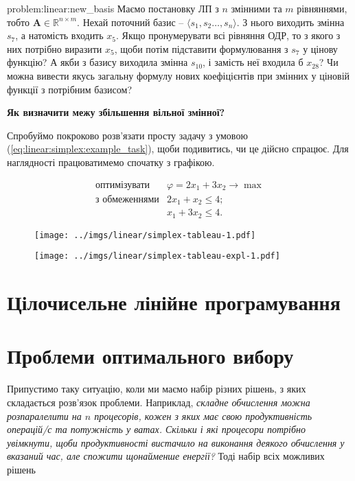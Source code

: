 \documentclass[\main/book.tex]{subfiles}
\begin{document}
\begin{problem}{problem:linear:new_basis}
 Маємо постановку ЛП з $n$ змінними та $m$ рівняннями, тобто $\mathbf{A} \in \mathbb{R}^{n \times m}$. Нехай поточний базис -- $\langle s_1, s_2 \ldots, s_n \rangle$. З нього виходить змінна $s_7$, а натомість входить $x_5$. Якщо пронумерувати всі рівняння ОДР, то з якого з них потрібно виразити $x_5$, щоби потім підставити формулювання з $s_7$ у цінову функцію? А якби з базису виходила змінна $s_{10}$, і замість неї входила б $x_{28}$? Чи можна вивести якусь загальну формулу нових коефіцієнтів при змінних у ціновій функції з потрібним базисом?
\end{problem}

\textbf{Як визначити межу збільшення вільної змінної?} \quad

Спробуймо покроково розв'язати просту задачу з умовою (\ref{eq:linear:simplex:example_task}), щоби подивитись, чи це дійсно спрацює. Для наглядності працюватимемо спочатку з графікою.

\begin{equation}
 \begin{array}{rl}
  \text{оптимізувати}  & \varphi = 2 x_1 + 3 x_2 \rightarrow \max \\
  \text{з обмеженнями} & 2 x_1 +   x_2 \leq 4; \\
                       &   x_1 + 3 x_2 \leq 4.
 \end{array}
 \label{eq:linear:simplex:example_task}
\end{equation}

\begin{figure}
 \centering
 \texttt{[image: ../imgs/linear/simplex-tableau-1.pdf]}
\end{figure}

\begin{figure}
 \centering
 \texttt{[image: ../imgs/linear/simplex-tableau-expl-1.pdf]}
\end{figure}
\section{Цілочисельне лінійне програмування}
\label{section:linear:integer}

\section{Проблеми оптимального вибору}
\label{section:linear:x_in_0-1}

Припустимо таку ситуацію, коли ми маємо набір різних рішень, з яких складається розв'язок проблеми. Наприклад, \textit{складне обчислення можна розпаралелити на $n$ процесорів, кожен з яких має свою продуктивність операцій/с та потужність у ватах. Скільки і які процесори потрібно увімкнути, щоби продуктивності вистачило на виконання деякого обчислення у вказаний час, але спожити щонайменше енергії?} Тоді набір всіх можливих рішень
\end{document}
